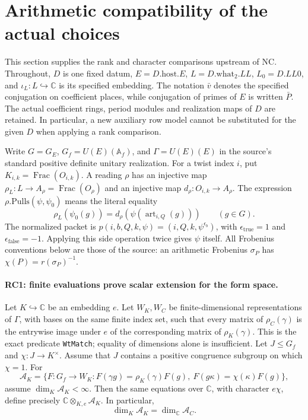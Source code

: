 \section{Arithmetic compatibility of the actual choices}
\label{sec:arithmetic-compatibility}

This section supplies the rank and character comparisons upstream of NC.
Throughout, $D$ is one fixed datum, $E=D.\mathrm{host}.E$,
$L=D.\mathrm{what}_2.LL$, $L_0=D.LL0$, and
$\iota_L:L\hookrightarrow\mathbb C$ is its specified embedding.
The notation $\bar v$ denotes the specified conjugation on coefficient
places, while conjugation of primes of $E$ is written $\bar P$.
The actual coefficient rings, period modules and realization maps of $D$
are retained. In particular, a new auxiliary row model cannot be substituted
for the given $D$ when applying a rank comparison.

Write $G=G_E$, $G_f=U(E)(\mathbb A_f)$, and $\Gamma=U(E)(E)$ in the
source's standard positive definite unitary realization. For a twist index
$i$, put $K_{i,k}=\operatorname{Frac}(O_{i,k})$. A reading $\rho$ has an
injective map $\rho_L:L\to A_\rho=\operatorname{Frac}(O_\rho)$ and an
injective map $d_\rho:O_{i,k}\to A_\rho$. The expression
$\rho.\mathrm{Pulls}(\psi,\psi_0)$ means the literal equality
\[
 \rho_L(\psi_0(g))=d_\rho(\psi(\operatorname{art}_{i,Q}(g)))
 \qquad(g\in G).                                      \tag{RC.1}
\]
The normalized packet is
$p(i,b,Q,k,\psi)=(i,Q,k,\psi^{\epsilon_b})$, with
$\epsilon_{\mathrm{true}}=1$ and
$\epsilon_{\mathrm{false}}=-1$. Applying this side operation twice gives
$\psi$ itself. All Frobenius conventions below are those of the source:
an arithmetic Frobenius $\sigma_P$ has
$\chi(P)=r(\sigma_P)^{-1}$.

\paragraph{RC1: finite evaluations prove scalar extension for the form space.}
Let $K\hookrightarrow\mathbb C$ be an embedding $e$. Let $W_K,W_C$ be
finite-dimensional representations of $\Gamma$, with bases on the same
finite index set, such that every matrix of $\rho_C(\gamma)$ is the
entrywise image under $e$ of the corresponding matrix of $\rho_K(\gamma)$.
This is the exact predicate \texttt{WtMatch}; equality of dimensions alone
is insufficient. Let $J\le G_f$ and $\chi:J\to K^\times$. Assume that
$J$ contains a positive congruence subgroup on which $\chi=1$.
For
\[
 \mathcal A_K=\{F:G_f\to W_K:
 F(\gamma g)=\rho_K(\gamma)F(g),\
 F(g\kappa)=\chi(\kappa)F(g)\},
\]
assume $\dim_K\mathcal A_K<\infty$. Then the same equations over $\mathbb C$,
with character $e\chi$, define precisely
$\mathbb C\otimes_{K,e}\mathcal A_K$. In particular,
\[
 \dim_K\mathcal A_K=\dim_{\mathbb C}\mathcal A_C.          \tag{RC.2}
\]

